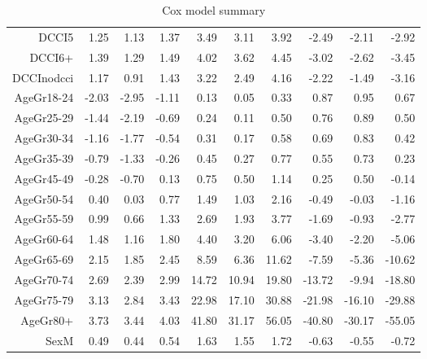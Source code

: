\begin{table}[ht]
\begin{tabular}{rrrrrrrrrr}
  DCCI5 & 1.25 & 1.13 & 1.37 & 3.49 & 3.11 & 3.92 & -2.49 & -2.11 & -2.92 \\ 
  DCCI6+ & 1.39 & 1.29 & 1.49 & 4.02 & 3.62 & 4.45 & -3.02 & -2.62 & -3.45 \\ 
  DCCInodcci & 1.17 & 0.91 & 1.43 & 3.22 & 2.49 & 4.16 & -2.22 & -1.49 & -3.16 \\ 
  AgeGr18-24 & -2.03 & -2.95 & -1.11 & 0.13 & 0.05 & 0.33 & 0.87 & 0.95 & 0.67 \\ 
  AgeGr25-29 & -1.44 & -2.19 & -0.69 & 0.24 & 0.11 & 0.50 & 0.76 & 0.89 & 0.50 \\ 
  AgeGr30-34 & -1.16 & -1.77 & -0.54 & 0.31 & 0.17 & 0.58 & 0.69 & 0.83 & 0.42 \\ 
  AgeGr35-39 & -0.79 & -1.33 & -0.26 & 0.45 & 0.27 & 0.77 & 0.55 & 0.73 & 0.23 \\ 
  AgeGr45-49 & -0.28 & -0.70 & 0.13 & 0.75 & 0.50 & 1.14 & 0.25 & 0.50 & -0.14 \\ 
  AgeGr50-54 & 0.40 & 0.03 & 0.77 & 1.49 & 1.03 & 2.16 & -0.49 & -0.03 & -1.16 \\ 
  AgeGr55-59 & 0.99 & 0.66 & 1.33 & 2.69 & 1.93 & 3.77 & -1.69 & -0.93 & -2.77 \\ 
  AgeGr60-64 & 1.48 & 1.16 & 1.80 & 4.40 & 3.20 & 6.06 & -3.40 & -2.20 & -5.06 \\ 
  AgeGr65-69 & 2.15 & 1.85 & 2.45 & 8.59 & 6.36 & 11.62 & -7.59 & -5.36 & -10.62 \\ 
  AgeGr70-74 & 2.69 & 2.39 & 2.99 & 14.72 & 10.94 & 19.80 & -13.72 & -9.94 & -18.80 \\ 
  AgeGr75-79 & 3.13 & 2.84 & 3.43 & 22.98 & 17.10 & 30.88 & -21.98 & -16.10 & -29.88 \\ 
  AgeGr80+ & 3.73 & 3.44 & 4.03 & 41.80 & 31.17 & 56.05 & -40.80 & -30.17 & -55.05 \\ 
  SexM & 0.49 & 0.44 & 0.54 & 1.63 & 1.55 & 1.72 & -0.63 & -0.55 & -0.72 \\ 
   \hline
\end{tabular}
\caption{Cox model summary} 
\end{table}

